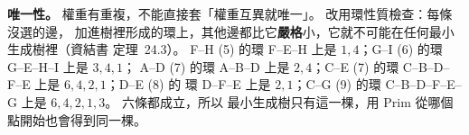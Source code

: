 \begin{pastsoln}
\textbf{唯一性。} 權重有重複，不能直接套「權重互異就唯一」。 改用環性質檢查：每條沒選的邊，
加進樹裡形成的環上，其他邊都比它\textbf{嚴格}小，它就不可能在任何最小生成樹裡（資結書
定理~24.3）。 F--H (5) 的環 F--E--H 上是 $1, 4$；G--I (6) 的環 G--E--H--I 上是 $3, 4, 1$；
A--D (7) 的環 A--B--D 上是 $2, 4$；C--E (7) 的環 C--B--D--F--E 上是 $6, 4, 2, 1$；D--E (8) 的
環 D--F--E 上是 $2, 1$；C--G (9) 的環 C--B--D--F--E--G 上是 $6, 4, 2, 1, 3$。 六條都成立，所以
最小生成樹只有這一棵，用 Prim 從哪個點開始也會得到同一棵。
\end{pastsoln}
